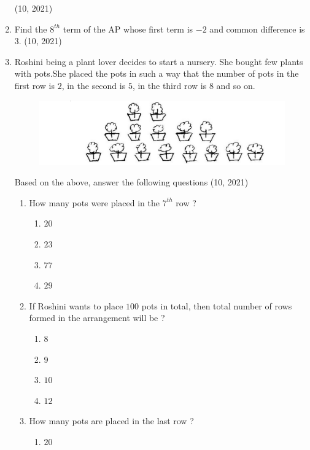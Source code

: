 \begin{enumerate}[label=\thesubsection.\arabic*,ref=\thesubsection.\theenumi,itemsep=1pt]
	\hfill (10,  2021) \item Find the $8^{th}$ term of the AP whose first term is $-2$ and common difference is $3$.
%
	\hfill (10, 2021) \item
	Roshini being a plant lover decides to start a nursery. She bought few plants with pots.She placed the pots in such a way that the number of pots in the first row is $2$, in the second is $5$, in the third row is $8$ and so on.
		\begin{figure}[H]
			\centering	
			\includegraphics[width=\columnwidth]{figs/ap/Plant.png}
			\caption{}
			\label{fig:Plants}
		\end{figure}
		Based on the above, answer the following questions 
\hfill (10, 2021)
		\begin{enumerate}
\item How many pots were placed in the $7^{th}$ row ?
				\begin{multicols}{4}
\begin{enumerate}    
					 \item $20$
					 \item $23$
					 \item $77$
					 \item $29$
				\end{enumerate}
\end{multicols}
 \item If Roshini wants to place $100$ pots in total, then total number of rows formed in the arrangement will be ?
				\begin{multicols}{4}
\begin{enumerate}    
					 \item $8$
					 \item $9$
					 \item $10$
					 \item $12$
				\end{enumerate}
\end{multicols}
 \item How many pots are placed in the last row ?
				\begin{multicols}{4}
\begin{enumerate}    
					 \item $20$

\end{enumerate}
\end{multicols}
\end{enumerate}
\end{enumerate}
